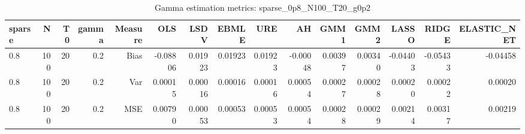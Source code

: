 \begin{table}[!htbp]\centering
\caption{Gamma estimation metrics: sparse_0p8_N100_T20_g0p2}
\label{tab:table1_sparse_0p8_N100_T20_g0p2}
\begin{tabular}{lrrrrrrrrrrrrrr}
\hline
sparse & N & T0 & gamma & Measure & OLS & LSDV & EBMLE & URE & AH & GMM1 & GMM2 & LASSO & RIDGE & ELASTIC_NET \\
\hline
0.8 & 100 & 20 & 0.2 & Bias & -0.08806 & 0.01923 & 0.01923 & 0.01923 & -0.00048 & 0.00397 & 0.00340 & -0.04403 & -0.05433 & -0.04458 \\
0.8 & 100 & 20 & 0.2 & Var & 0.00015 & 0.00016 & 0.00016 & 0.00016 & 0.00054 & 0.00027 & 0.00028 & 0.00020 & 0.00022 & 0.00020 \\
0.8 & 100 & 20 & 0.2 & MSE & 0.00790 & 0.00053 & 0.00053 & 0.00053 & 0.00054 & 0.00028 & 0.00029 & 0.00214 & 0.00317 & 0.00219 \\
\hline
\end{tabular}
\end{table}

